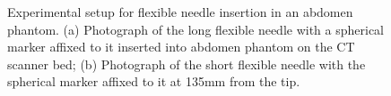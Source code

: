 


\begin{figure}[t]
  \centering
  \hfill
  \caption{Experimental setup for flexible needle insertion in an abdomen phantom. (a) Photograph of the long flexible needle with a spherical marker affixed to it inserted into abdomen phantom on the CT scanner bed; (b) Photograph of the short flexible needle with the spherical marker affixed to it at 135mm from the tip.}
    \label{fig:figures/fractional}
\end{figure}



